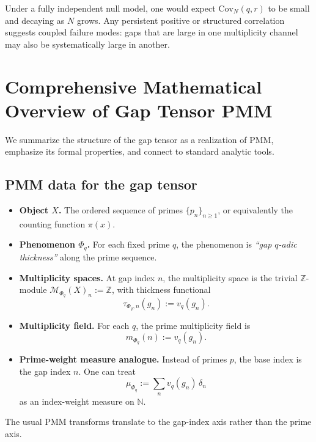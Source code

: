 \documentclass[11pt]{article}
\theoremstyle{definition}
\theoremstyle{plain}
\theoremstyle{remark}
\newcommand{\ZZ}{\mathbb{Z}}
\newcommand{\Cov}{\mathrm{Cov}}
\newcommand{\1}{\mathbb{1}}
\begin{document}
Under a fully independent null model, one would expect \(\Cov_N(q,r)\) to be small and decaying as \(N\) grows. Any persistent positive or structured correlation suggests coupled failure modes: gaps that are large in one multiplicity channel may also be systematically large in another.

\section{Comprehensive Mathematical Overview of Gap Tensor PMM}

We summarize the structure of the gap tensor as a realization of PMM, emphasize its formal properties, and connect to standard analytic tools.

\subsection{PMM data for the gap tensor}

\begin{itemize}[leftmargin=*]
  \item \textbf{Object \(X\).} The ordered sequence of primes \(\{p_n\}_{n\ge 1}\), or equivalently the counting function \(\pi(x)\).
  \item \textbf{Phenomenon \(\Phi_q\).} For each fixed prime \(q\), the phenomenon is \emph{``gap \(q\)-adic thickness''} along the prime sequence.
  \item \textbf{Multiplicity spaces.} At gap index \(n\), the multiplicity space is the trivial \(\ZZ\)-module \(\mathcal{M}_{\Phi_q}(X)_n := \ZZ\), with thickness functional
  \[
    \tau_{\Phi_q,n}(g_n) := v_q(g_n).
  \]
  \item \textbf{Multiplicity field.} For each \(q\), the prime multiplicity field is
  \[
    m_{\Phi_q}(n) := v_q(g_n).
  \]
  \item \textbf{Prime-weight measure analogue.} Instead of primes \(p\), the base index is the gap index \(n\). One can treat
  \[
    \mu_{\Phi_q} := \sum_{n} v_q(g_n)\,\delta_n
  \]
  as an index-weight measure on \(\mathbb{N}\).
\end{itemize}

The usual PMM transforms translate to the gap-index axis rather than the prime axis.
\end{document}
